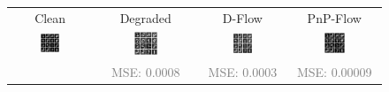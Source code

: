 \documentclass{article} %
\theoremstyle{definition}
\begin{document}
 \begin{figure}[htp]
    \centering
    \begin{adjustbox}{max width=0.8\textwidth}
    \begin{tabular}{cccc}
    Clean & Degraded & D-Flow &  PnP-Flow \\
    \includegraphics[width=0.25\textwidth]{figures/diri/groundtruth_den.png} &  \includegraphics[width=0.25\textwidth]{figures/diri/measurements_den.png} &     \includegraphics[width=0.25\textwidth]{figures/diri/Dreco_den.png} & \includegraphics[width=0.25\textwidth]{figures/diri/reco_den.png} \\
    & \textcolor{gray}{MSE: 0.0008} & \textcolor{gray}{MSE: 0.0003}& \textcolor{gray}{MSE: 0.00009} \\

\end{tabular}
\end{adjustbox}
\end{figure}
\end{document}
